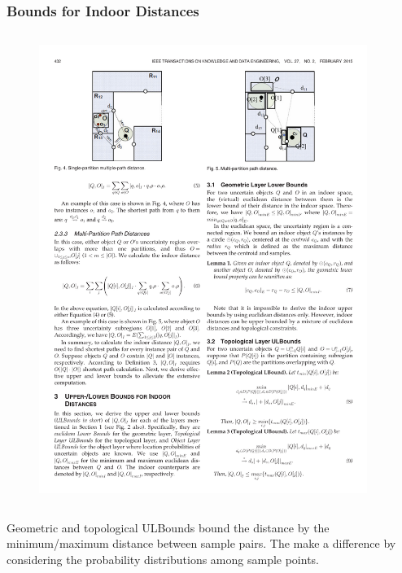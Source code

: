 
\begin{frame}
\frametitle{Bounds for Indoor Distances}

\begin{columns}[c]

  \begin{figure}[tb]
    \includegraphics[width=\columnwidth]{figures/2-7/2-7-3.pdf}
  \end{figure}

  \begin{example}
  \end{example}

\end{columns}

\vspace{15pt}

\textrm{Geometric and topological ULBounds bound the distance by the minimum/maximum distance between sample pairs. The  make a difference by considering the probability distributions among sample points.}

\end{frame}

